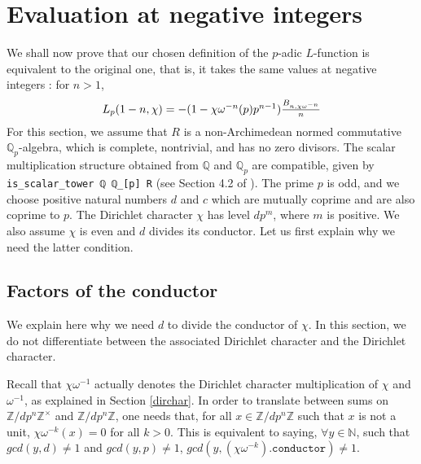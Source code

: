 \documentclass[a4paper,UKenglish,cleveref, autoref, thm-restate,pdfa]{lipics-v2021}
\newcommand{\lean}[1]{\texttt{#1}\xspace} %
\begin{document}
\section{Evaluation at negative integers}
\label{section4}
We shall now prove that our chosen definition of the $p$-adic $L$-function is equivalent to the original one, that is, 
it takes the same values at negative integers : for $n > 1$,
\begin{equation}\label{eqn:1}
  $$ L_p (1 - n, \chi) = -(1 - \chi \omega^{-n}(p)p^{n - 1}) \frac{B_{n, \chi \omega^{-n}}}{n} $$
\end{equation}
For this section, we assume that $R$ is a non-Archimedean normed commutative $\mathbb{Q}_p$-algebra, 
which is complete, nontrivial, and has no zero divisors. The scalar multiplication structure obtained from $\mathbb{Q}$ 
and $\mathbb{Q}_p$ are compatible, given by \lean{is\_scalar\_tower ℚ ℚ\_[p] R} (see Section 4.2 of \cite{DD}). 
The prime $p$ is odd, and we choose positive natural numbers $d$ and $c$ which are mutually coprime and are also coprime to 
$p$. The Dirichlet character $\chi$ has level $d p^m$, where $m$ is positive. We also assume $\chi$ is even and $d$ divides 
its conductor. Let us first explain why we need the latter condition.

\subsection{Factors of the conductor}
We explain here why we need $d$ to divide the conductor of $\chi$. In this section, we do not differentiate between the associated Dirichlet 
character and the Dirichlet character. 

Recall that $\chi \omega^{-1}$ actually denotes the Dirichlet 
character multiplication of $\chi$ and $\omega^{-1}$, as explained in Section \ref{dirchar}. %
In order to translate between sums on $\mathbb{Z}/ d p^n \mathbb{Z} ^{\times}$ and $\mathbb{Z}/ d p^n \mathbb{Z}$, one needs that, for all $x \in \mathbb{Z}/ d p^n \mathbb{Z}$ 
such that $x$ is not a unit, $\chi \omega^{-k} (x) = 0$ for all $k > 0$. This is equivalent to saying, $\forall y \in \mathbb{N}$, such that 
$gcd (y, d) \ne 1$ and $gcd (y, p) \ne 1$, $gcd (y, (\chi \omega^{-k})\texttt{.conductor}) \ne 1$. 
\end{document}
